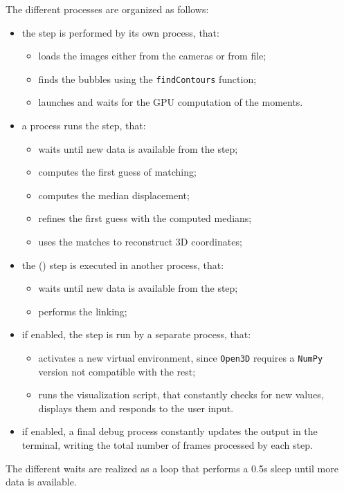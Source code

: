 The different processes are organized as follows:
\begin{itemize}
	\item the \locate* step is performed by its own process, that:
	      \begin{itemize}[topsep=0pt]
		      \itemsep 0em
		      \item loads the images either from the cameras or from file;
		      \item finds the bubbles using the \texttt{findContours} function;
		      \item launches and waits for the GPU computation of the moments.
	      \end{itemize}
	\item a process runs the \match* step, that:
	      \begin{itemize}[topsep=0pt]
		      \itemsep 0em
		      \item waits until new data is available from the \locate* step;
		      \item computes the first guess of matching;
		      \item computes the median displacement;
		      \item refines the first guess with the computed medians;
		      \item uses the matches to reconstruct 3D coordinates;
	      \end{itemize}
	\item the \link* (\linkDDD*) step is executed in another process, that:
	      \begin{itemize}[topsep=0pt]
		      \itemsep 0em
		      \item waits until new data is available from the \match* step;
		      \item performs the linking;
	      \end{itemize}
	\item if enabled, the \visual* step is run by a separate process, that:
	      \begin{itemize}[topsep=0pt]
		      \itemsep 0em
		      \item activates a new virtual environment, since \texttt{Open3D} requires a \texttt{NumPy} version not compatible with the rest;
		      \item runs the visualization script, that constantly checks for new values, displays them and responds to the user input.
	      \end{itemize}
	\item if enabled, a final debug process constantly updates the output in the terminal, writing the total number of frames processed by each step.
\end{itemize}
The different waits are realized as a loop that performs a 0.5s sleep until more data is available.
